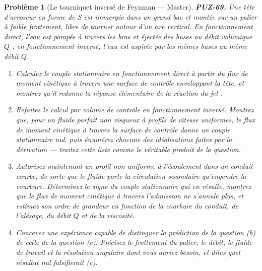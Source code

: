 \documentclass[11pt]{article}
\newtheorem{problem}{Problème}
\begin{document}
\begin{problem}[{Le tourniquet inversé de Feynman --- Master}]
\textbf{PUZ-69.} Une tête d'arroseur en forme de S est immergée dans un grand bac et
montée sur un palier à faible frottement, libre de tourner autour d'un axe vertical. En
fonctionnement direct, l'eau est pompée à travers les bras et éjectée des buses au débit
volumique $ Q $ ; en fonctionnement inversé, l'eau est aspirée par les mêmes buses au même
débit $ Q $.
\begin{enumerate}
\item[(a)] Calculez le couple stationnaire en fonctionnement direct à partir du flux de moment
cinétique à travers une surface de contrôle enveloppant la tête, et montrez qu'il redonne la
réponse élémentaire de la \og{} réaction du jet \fg{}.
\item[(b)] Refaites le calcul par volume de contrôle en fonctionnement inversé. Montrez que, pour un
fluide parfait non visqueux à profils de vitesse uniformes, le flux de moment cinétique à
travers la surface de contrôle donne un couple stationnaire nul, puis énumérez chacune des
idéalisations faites par la dérivation --- traitez cette liste comme le véritable produit de la
question.
\item[(c)] Autorisez maintenant un profil non uniforme à l'écoulement dans un conduit courbe, de
sorte que le fluide porte la circulation secondaire qu'engendre la courbure. Déterminez le
signe du couple stationnaire qui en résulte, montrez que le flux de moment cinétique à
travers l'admission ne s'annule plus, et estimez son ordre de grandeur en fonction de la
courbure du conduit, de l'alésage, du débit $ Q $ et de la viscosité.
\item[(d)] Concevez une expérience capable de distinguer la prédiction de la question (b) de celle
de la question (c). Précisez le frottement du palier, le débit, le fluide de travail et la
résolution angulaire dont vous auriez besoin, et dites quel résultat nul falsifierait
(c).
\end{enumerate}

\end{problem}
\end{document}
